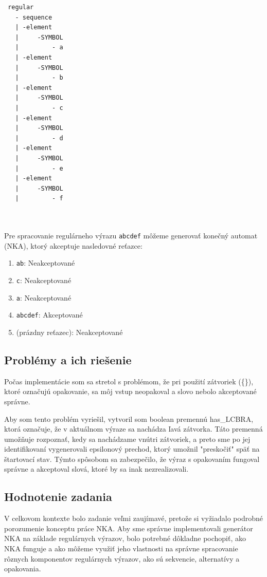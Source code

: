 \documentclass[a4paper,12pt]{article}
\begin{document}
\begin{verbatim}
 regular
   - sequence
   | -element
   |     -SYMBOL
   |         - a
   | -element
   |     -SYMBOL
   |         - b
   | -element
   |     -SYMBOL
   |         - c
   | -element
   |     -SYMBOL
   |         - d
   | -element
   |     -SYMBOL
   |         - e
   | -element
   |     -SYMBOL
   |         - f

   
    \end{verbatim}

Pre spracovanie regulárneho výrazu \texttt{abcdef} môžeme generovať konečný automat (NKA), ktorý akceptuje nasledovné reťazce:

\begin{enumerate}
    \item \texttt{ab}: Neakceptované
    \item \texttt{c}: Neakceptované
    \item \texttt{a}: Neakceptované
    \item \texttt{abcdef}: Akceptované
    \item \texttt{} (prázdny reťazec): Neakceptované
\end{enumerate}

\subsection{Problémy a ich riešenie}
Počas implementácie som sa stretol s problémom, že pri použití zátvoriek (\{\}), ktoré označujú opakovanie, sa môj vstup neopakoval a slovo nebolo akceptované správne. 

Aby som tento problém vyriešil, vytvoril som boolean premennú has\_LCBRA, ktorá označuje, že v aktuálnom výraze sa nachádza ľavá zátvorka. Táto premenná umožňuje rozpoznať, kedy sa nachádzame vnútri zátvoriek, a preto sme po jej identifikovaní vygenerovali epsilonový prechod, ktorý umožnil "preskočiť" späť na štartovací stav. Týmto spôsobom sa zabezpečilo, že výraz s opakovaním fungoval správne a akceptoval slová, ktoré by sa inak nezrealizovali.

\subsection{Hodnotenie zadania}

V celkovom kontexte bolo zadanie veľmi zaujímavé, pretože si vyžiadalo podrobné porozumenie konceptu práce NKA. Aby sme správne implementovali generátor NKA na základe regulárnych výrazov, bolo potrebné dôkladne pochopiť, ako NKA funguje a ako môžeme využiť jeho vlastnosti na správne spracovanie rôznych komponentov regulárnych výrazov, ako sú sekvencie, alternatívy a opakovania.
\end{document}
